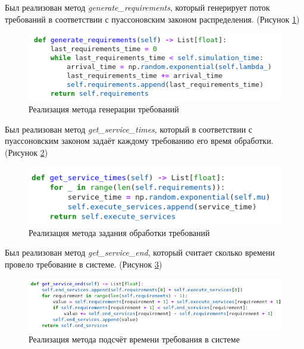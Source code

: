 \documentclass[14pt,fleqn]{extarticle}
\begin{document}
	\newpage
	Был реализован метод \textit{generate\textup{\_}requirements}, который генерирует поток требований в соответствии с пуассоновским законом распределения. (Рисунок \ref{fig:queuing_system_with_infinity_queue_generate_requirements})
	\begin{figure}[h]
		\centering \includegraphics[scale=0.62]{queuing_system_with_infinity_queue_generate_requirements}
		\caption{Реализация метода генерации требований}
		\label{fig:queuing_system_with_infinity_queue_generate_requirements}
	\end{figure}

	Был реализован метод \textit{get\textup{\_}service\textup{\_}times}, который в соответствии с пуассоновским законом задаёт каждому требованию его время обработки. (Рисунок \ref{fig:queuing_system_with_infinity_queue_get_service_times})
	\begin{figure}[h]
		\centering \includegraphics[scale=0.62]{queuing_system_with_infinity_queue_get_service_times}
		\caption{Реализация метода задания обработки требований}
		\label{fig:queuing_system_with_infinity_queue_get_service_times}
	\end{figure}

	Был реализован метод \textit{get\textup{\_}service\textup{\_}end}, который считает сколько времени провело требование в системе. (Рисунок \ref{fig:queuing_system_with_infinity_queue_get_service_end})
	\begin{figure}[h]
		\centering \includegraphics[scale=0.62]{queuing_system_with_infinity_queue_get_service_end}
		\caption{Реализация метода подсчёт времени требования в системе}
		\label{fig:queuing_system_with_infinity_queue_get_service_end}
	\end{figure}
	
\end{document}
